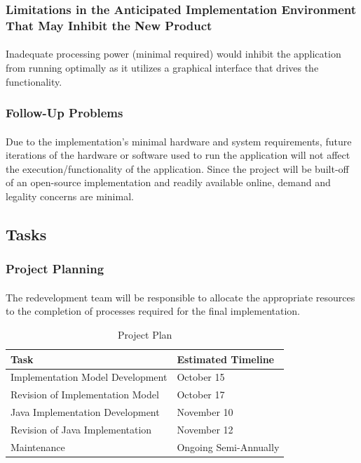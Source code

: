 \documentclass[12pt, titlepage]{article}
\begin{document}
\subsubsection{Limitations in the Anticipated Implementation Environment That May Inhibit the New Product}
\paragraph{}
Inadequate processing power (minimal required) would inhibit the application from running optimally as it utilizes a graphical interface that drives the functionality.

\subsubsection{Follow-Up Problems}
\paragraph{}
Due to the implementation's minimal hardware and system requirements, future iterations of the hardware or software used to run the application will not affect the execution/functionality of the application. Since the project will be built-off of an open-source implementation and readily available online, demand and legality concerns are minimal.

\subsection{Tasks}

\subsubsection{Project Planning}
\paragraph{}
The redevelopment team will be responsible to allocate the appropriate resources to the completion of processes required for the final implementation.\\
\begin{table}[H]
\caption{Project Plan} \label{tab:plan}
\begin{center}
\begin{tabular}{| l | l |}
\hline
\textbf{Task} & \textbf{Estimated Timeline} \\ \hline
Implementation Model Development & October 15 \\ \hline
Revision of Implementation Model & October 17 \\ \hline
Java Implementation Development & November 10 \\ \hline
Revision of Java Implementation & November 12 \\ \hline
Maintenance & Ongoing Semi-Annually \\
\hline
\end{tabular}
\end{center}
\end{table}
\end{document}
